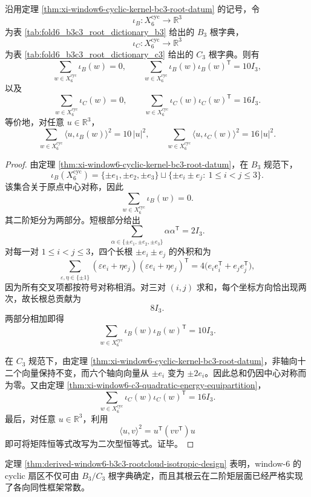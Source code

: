 \begin{theorem}\label{thm:derived-window6-b3c3-rootcloud-isotropic-design}
沿用定理 \ref{thm:xi-window6-cyclic-kernel-bc3-root-datum} 的记号，令
\[
\iota_B:X_6^{\mathrm{cyc}}\to \mathbb R^3
\]
为表 \ref{tab:fold6_b3c3_root_dictionary_b3} 给出的 \(B_3\) 根字典，
\[
\iota_C:X_6^{\mathrm{cyc}}\to \mathbb R^3
\]
为表 \ref{tab:fold6_b3c3_root_dictionary_c3} 给出的 \(C_3\) 根字典。则有
\[
\sum_{w\in X_6^{\mathrm{cyc}}}\iota_B(w)=0,
\qquad
\sum_{w\in X_6^{\mathrm{cyc}}}\iota_B(w)\iota_B(w)^{\mathsf T}=10I_3,
\]
以及
\[
\sum_{w\in X_6^{\mathrm{cyc}}}\iota_C(w)=0,
\qquad
\sum_{w\in X_6^{\mathrm{cyc}}}\iota_C(w)\iota_C(w)^{\mathsf T}=16I_3.
\]
等价地，对任意 \(u\in\mathbb R^3\)，
\[
\sum_{w\in X_6^{\mathrm{cyc}}}\langle u,\iota_B(w)\rangle^2=10\,|u|^2,
\qquad
\sum_{w\in X_6^{\mathrm{cyc}}}\langle u,\iota_C(w)\rangle^2=16\,|u|^2.
\]
\end{theorem}
\begin{proof}
由定理 \ref{thm:xi-window6-cyclic-kernel-bc3-root-datum}，在 \(B_3\) 规范下，
\[
\iota_B(X_6^{\mathrm{cyc}})
=
\{\pm e_1,\pm e_2,\pm e_3\}
\sqcup
\{\pm e_i\pm e_j:\ 1\le i<j\le 3\}.
\]
该集合关于原点中心对称，因此
\[
\sum_{w\in X_6^{\mathrm{cyc}}}\iota_B(w)=0.
\]
其二阶矩分为两部分。短根部分给出
\[
\sum_{\alpha\in\{\pm e_1,\pm e_2,\pm e_3\}}\alpha\alpha^{\mathsf T}=2I_3.
\]
对每一对 \(1\le i<j\le 3\)，四个长根 \(\pm e_i\pm e_j\) 的外积和为
\[
\sum_{\varepsilon,\eta\in\{\pm1\}}
(\varepsilon e_i+\eta e_j)(\varepsilon e_i+\eta e_j)^{\mathsf T}
=
4\bigl(e_ie_i^{\mathsf T}+e_je_j^{\mathsf T}\bigr),
\]
因为所有交叉项都按符号对称相消。对三对 \((i,j)\) 求和，每个坐标方向恰出现两次，故长根总贡献为
\[
8I_3.
\]
两部分相加即得
\[
\sum_{w\in X_6^{\mathrm{cyc}}}\iota_B(w)\iota_B(w)^{\mathsf T}=10I_3.
\]

在 \(C_3\) 规范下，由定理 \ref{thm:xi-window6-cyclic-kernel-bc3-root-datum}，非轴向十二个向量保持不变，而六个轴向向量从 \(\pm e_i\) 变为 \(\pm 2e_i\)。因此总和仍因中心对称而为零。又由定理 \ref{thm:xi-window6-c3-quadratic-energy-equipartition}，
\[
\sum_{w\in X_6^{\mathrm{cyc}}}\iota_C(w)\iota_C(w)^{\mathsf T}=16I_3.
\]
最后，对任意 \(u\in\mathbb R^3\)，利用
\[
\langle u,v\rangle^2=u^{\mathsf T}(vv^{\mathsf T})u
\]
即可将矩阵恒等式改写为二次型恒等式。证毕。
\end{proof}

\begin{remark}[根云与二次统计的旋转不变性]\label{rem:derived-window6-rootcloud-quadratic-isotropy}
定理 \ref{thm:derived-window6-b3c3-rootcloud-isotropic-design} 表明，window-\(6\) 的 cyclic 扇区不仅可由 \(B_3/C_3\) 根字典确定，而且其根云在二阶矩层面已经严格实现了各向同性框架常数。
\end{remark}

